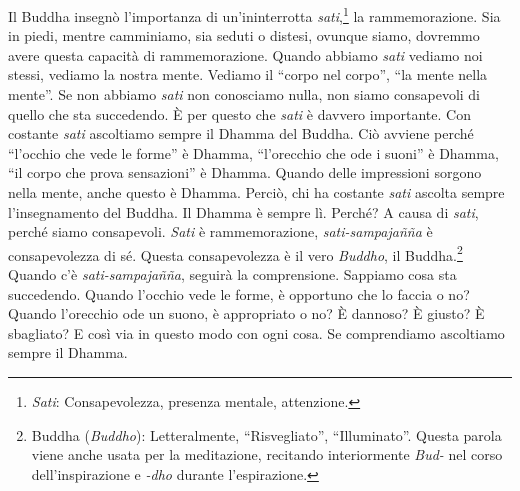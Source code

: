 Il Buddha insegnò l'importanza di un'ininterrotta \emph{sati},\footnote{\emph{Sati}:
  Consapevolezza, presenza mentale, attenzione.} la rammemorazione. Sia
in piedi, mentre camminiamo, sia seduti o distesi, ovunque siamo,
dovremmo avere questa capacità di rammemorazione. Quando abbiamo
\emph{sati} vediamo noi stessi, vediamo la nostra mente. Vediamo il
``corpo nel corpo'', ``la mente nella mente''. Se non abbiamo
\emph{sati} non conosciamo nulla, non siamo consapevoli di quello che
sta succedendo. È per questo che \emph{sati} è davvero importante. Con
costante \emph{sati} ascoltiamo sempre il Dhamma del Buddha. Ciò avviene
perché ``l'occhio che vede le forme'' è Dhamma, ``l'orecchio che ode i
suoni'' è Dhamma, ``il corpo che prova sensazioni'' è Dhamma. Quando
delle impressioni sorgono nella mente, anche questo è Dhamma. Perciò,
chi ha costante \emph{sati} ascolta sempre l'insegnamento del Buddha. Il
Dhamma è sempre lì. Perché? A causa di \emph{sati}, perché siamo
consapevoli. \emph{Sati} è rammemorazione, \emph{sati-sampajañña} è
consapevolezza di sé. Questa consapevolezza è il vero \emph{Buddho}, il
Buddha.\footnote{Buddha (\emph{Buddho}): Letteralmente, ``Risvegliato'',
  ``Illuminato''. Questa parola viene anche usata per la meditazione,
  recitando interiormente \emph{Bud-} nel corso dell'inspirazione e
  \emph{-dho} durante l'espirazione.} Quando c'è \emph{sati-sampajañña},
seguirà la comprensione. Sappiamo cosa sta succedendo. Quando l'occhio
vede le forme, è opportuno che lo faccia o no? Quando l'orecchio ode un
suono, è appropriato o no? È dannoso? È giusto? È sbagliato? E così via
in questo modo con ogni cosa. Se comprendiamo ascoltiamo sempre il
Dhamma.

